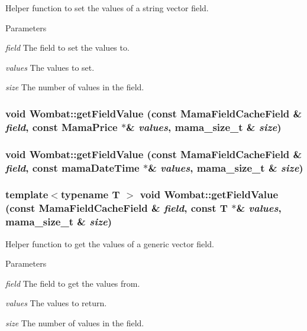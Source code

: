Helper function to set the values of a string vector field. 
\begin{DoxyParams}{Parameters}
\item[{\em field}]The field to set the values to. \item[{\em values}]The values to set. \item[{\em size}]The number of values in the field. \end{DoxyParams}
\hypertarget{namespaceWombat_a620d57026928c4adef3dd157050a4116}{
\subsubsection[{getFieldValue}]{\setlength{\rightskip}{0pt plus 5cm}void Wombat::getFieldValue (const MamaFieldCacheField \& {\em field}, \/  const MamaPrice $\ast$\& {\em values}, \/  {\bf mama\_\-size\_\-t} \& {\em size})}}
\label{namespaceWombat_a620d57026928c4adef3dd157050a4116}
\hypertarget{namespaceWombat_af33eaf1993e8aebd08598298b4139f56}{
\subsubsection[{getFieldValue}]{\setlength{\rightskip}{0pt plus 5cm}void Wombat::getFieldValue (const MamaFieldCacheField \& {\em field}, \/  const mamaDateTime $\ast$\& {\em values}, \/  {\bf mama\_\-size\_\-t} \& {\em size})}}
\label{namespaceWombat_af33eaf1993e8aebd08598298b4139f56}
\hypertarget{namespaceWombat_af39725b3f2d193e7b4fb37dc9e00ab00}{
\subsubsection[{getFieldValue}]{\setlength{\rightskip}{0pt plus 5cm}template$<$typename T $>$ void Wombat::getFieldValue (const MamaFieldCacheField \& {\em field}, \/  const T $\ast$\& {\em values}, \/  {\bf mama\_\-size\_\-t} \& {\em size})}}
\label{namespaceWombat_af39725b3f2d193e7b4fb37dc9e00ab00}


Helper function to get the values of a generic vector field. 
\begin{DoxyParams}{Parameters}
\item[{\em field}]The field to get the values from. \item[{\em values}]The values to return. \item[{\em size}]The number of values in the field. \end{DoxyParams}


